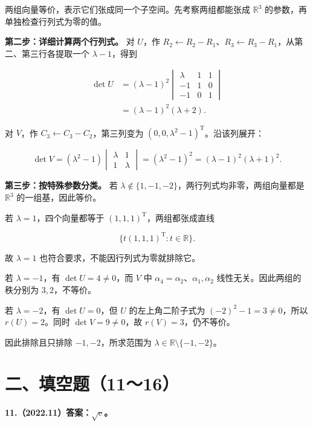 \documentclass[UTF8,11pt,fontset=windows]{ctexart}
\begin{document}
两组向量等价，表示它们张成同一个子空间。先考察两组都能张成 $\mathbb R^3$ 的参数，再单独检查行列式为零的值。

\textbf{第二步：详细计算两个行列式。} 对 $U$，作 $R_2\leftarrow R_2-R_1$、$R_3\leftarrow R_3-R_1$，从第二、第三行各提取一个 $\lambda-1$，得到

$$
\begin{aligned}
\det U
&=(\lambda-1)^2\begin{vmatrix}\lambda&1&1\\-1&1&0\\-1&0&1\end{vmatrix}\\
&=(\lambda-1)^2(\lambda+2).
\end{aligned}
$$

对 $V$，作 $C_3\leftarrow C_3-C_2$，第三列变为 $(0,0,\lambda^2-1)^{\mathrm T}$。沿该列展开：

$$
\det V=(\lambda^2-1)\begin{vmatrix}\lambda&1\\1&\lambda\end{vmatrix}
=(\lambda^2-1)^2=(\lambda-1)^2(\lambda+1)^2.
$$

\textbf{第三步：按特殊参数分类。} 若 $\lambda\notin\{1,-1,-2\}$，两行列式均非零，两组向量都是 $\mathbb R^3$ 的一组基，因此等价。

若 $\lambda=1$，四个向量都等于 $(1,1,1)^{\mathrm T}$，两组都张成直线

$$
\{t(1,1,1)^{\mathrm T}:t\in\mathbb R\}.
$$

故 $\lambda=1$ 也符合要求，不能因行列式为零就排除它。

若 $\lambda=-1$，有 $\det U=4\ne0$，而 $V$ 中 $\alpha_4=\alpha_2$、$\alpha_1,\alpha_2$ 线性无关。因此两组的秩分别为 $3,2$，不等价。

若 $\lambda=-2$，有 $\det U=0$，但 $U$ 的左上角二阶子式为 $(-2)^2-1=3\ne0$，所以 $r(U)=2$。同时 $\det V=9\ne0$，故 $r(V)=3$，仍不等价。

因此排除且只排除 $-1,-2$，所求范围为 $\boxed{\lambda\in\mathbb R\setminus\{-1,-2\}}$。

\clearpage

\section*{二、填空题（11～16）}

\textbf{11.（2022.11）答案：$\sqrt{\mathrm e}$。}
\end{document}
